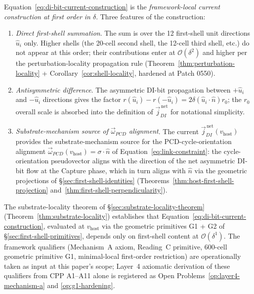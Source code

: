 \documentclass[11pt,letterpaper]{article}
\newcommand{\vhost}{v_{\text{host}}}
\newcommand{\jDInet}{\vec{j}_{DI}^{\,\text{net}}}
\newcommand{\omegaPCD}{\vec{\omega}_{PCD}}
\newcommand{\bigO}[1]{\mathcal{O}(#1)}
\begin{document}
Equation~\eqref{eq:di-bit-current-construction} is the \emph{framework-local current construction at first order in $\delta$}. Three features of the construction:

\begin{enumerate}[leftmargin=2em]
\item \emph{Direct first-shell summation}. The sum is over the 12 first-shell unit directions $\hat{u}_i$ only. Higher shells (the 20-cell second shell, the 12-cell third shell, etc.) do not appear at this order; their contributions enter at $\bigO{\delta^2}$ and higher per the perturbation-locality propagation rule (Theorem~\ref{thm:perturbation-locality} + Corollary~\ref{cor:shell-locality}, hardened at Patch 0550).
\item \emph{Antisymmetric difference}. The asymmetric DI-bit propagation between $+\hat{u}_i$ and $-\hat{u}_i$ directions gives the factor $r(\hat{u}_i) - r(-\hat{u}_i) = 2\delta (\hat{u}_i \cdot \hat{n}) r_0$; the $r_0$ overall scale is absorbed into the definition of $\jDInet$ for notational simplicity.
\item \emph{Substrate-mechanism source of $\omegaPCD$ alignment}. The current $\jDInet(\vhost)$ provides the substrate-mechanism source for the PCD-cycle-orientation alignment $\omegaPCD(\vhost) = \sigma \cdot \hat{n}$ of Equation~\eqref{eq:link-constraint}: the cycle-orientation pseudovector aligns with the direction of the net asymmetric DI-bit flow at the Capture phase, which in turn aligns with $\hat{n}$ via the geometric projections of \S\ref{sec:first-shell-identities} (Theorems~\ref{thm:host-first-shell-projection} and~\ref{thm:first-shell-perpendicularity}).
\end{enumerate}

The substrate-locality theorem of \S\ref{sec:substrate-locality-theorem} (Theorem~\ref{thm:substrate-locality}) establishes that Equation~\eqref{eq:di-bit-current-construction}, evaluated at $\vhost$ via the geometric primitives G1 + G2 of \S\ref{sec:first-shell-primitives}, depends only on first-shell content at $\bigO{\delta^1}$. The framework qualifiers (Mechanism~A axiom, Reading~C primitive, 600-cell geometric primitive G1, minimal-local first-order restriction) are operationally taken as input at this paper's scope; Layer~4 axiomatic derivation of these qualifiers from CPP A1--A11 alone is registered as Open Problems~\ref{op:layer4-mechanism-a} and \ref{op:g1-hardening}.

\end{document}
